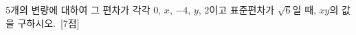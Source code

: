 5개의 변량에 대하여 그 편차가 각각 $0$, $x$, $-4$, $y$, $2$이고 표준편차가 $\sqrt{6}$일 때, $xy$의 값을 구하시오.~\mbox{\mbox{[7점]}}
